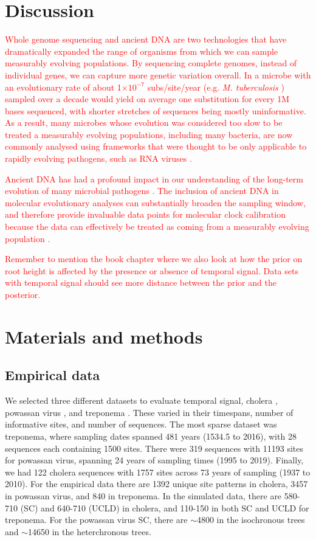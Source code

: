 \documentclass[10pt,letterpaper]{article}
\begin{document}
\section*{Discussion}

\textcolor{red}{
Whole genome sequencing and ancient DNA are two technologies that have dramatically expanded the range of organisms from which we can sample measurably evolving populations. By sequencing complete genomes, instead of individual genes, we can capture more genetic variation overall. In a microbe with an evolutionary rate of about 1$\times 10^{-7}$ subs/site/year (e.g. \textit{M. tuberculosis} \cite{menardo2019molecular}) sampled over a decade would yield on average one substitution for every 1M bases sequenced, with shorter stretches of sequences being mostly uninformative. As a result, many microbes whose evolution was considered too slow to be treated a measurably evolving populations, including many bacteria, are now commonly analysed using frameworks that were thought to be only applicable to rapidly evolving pathogens, such as RNA viruses \cite{biek2015measurably}.}

\textcolor{red}{Ancient DNA has had a profound impact in our understanding of the long-term evolution of many microbial pathogens \cite{duchene2020recovery,spyrou2019ancient}. The inclusion of ancient DNA in molecular evolutionary analyses can substantially broaden the sampling window, and therefore provide invaluable data points for molecular clock calibration because the data can effectively be treated as coming from a measurably evolving population \cite{ho2020dating}.}

\textcolor{red}{Remember to mention the book chapter where we also look at how the prior on root height is affected by the presence or absence of temporal signal. Data sets with temporal signal should see more distance between the prior and the posterior. }

\section*{Materials and methods}
\subsection*{Empirical data}
We selected three different datasets to evaluate temporal signal, cholera \cite{devault2014second}, powassan virus \cite{vogels2023phylogeographic}, and treponema \cite{majander2020ancient}. These varied in their timespans, number of informative sites, and number of sequences. The most sparse dataset was treponema, where sampling dates spanned 481 years (1534.5 to 2016), with 28 sequences each containing 1500 sites. There were 319 sequences with 11193 sites for powassan virus, spanning 24 years of sampling times (1995 to 2019). Finally, we had 122 cholera sequences with 1757 sites across 73 years of sampling (1937 to 2010).
For the empirical data there are 1392 unique site patterns in cholera, 3457 in powassan virus, and 840 in treponema. In the simulated data, there are 580-710 (SC) and 640-710 (UCLD) in cholera, and 110-150 in both SC and UCLD for treponema. For the powassan virus SC, there are $\sim$4800 in the isochronous trees and $\sim$14650 in the heterchronous trees.
\end{document}
